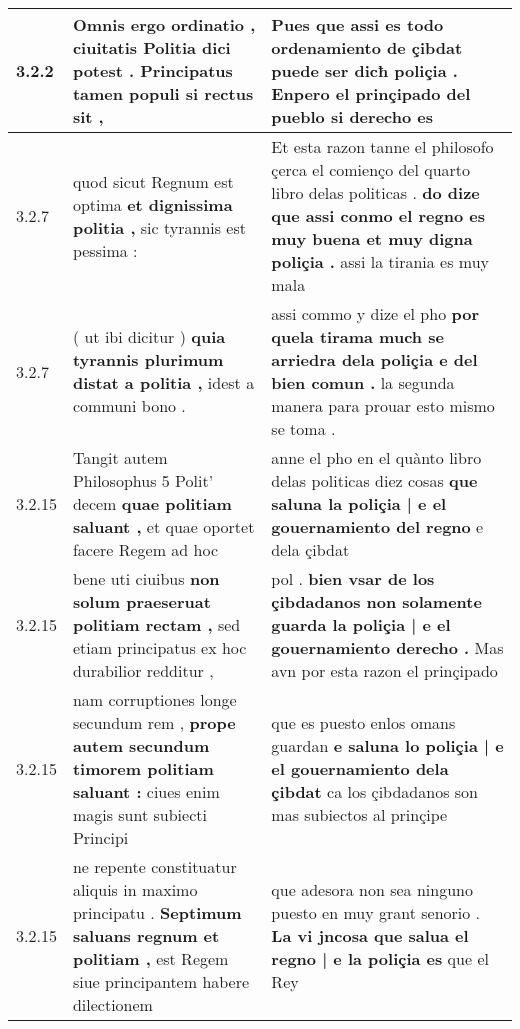 \begin{tabular}{|p{1cm}|p{6.5cm}|p{6.5cm}|}
3.2.2 & Omnis ergo ordinatio , \textbf{ ciuitatis Politia dici potest . } Principatus tamen populi si rectus sit , & Pues que assi es todo ordenamiento de çibdat \textbf{ puede ser dicħ poliçia . } Enpero el prinçipado del pueblo si derecho es \\\hline
3.2.7 & quod sicut Regnum est optima \textbf{ et dignissima politia , } sic tyrannis est pessima : & Et esta razon tanne el philosofo çerca el comienço del quarto libro delas politicas . \textbf{ do dize que assi conmo el regno es muy buena et muy digna poliçia . } assi la tirania es muy mala \\\hline
3.2.7 & ( ut ibi dicitur ) \textbf{ quia tyrannis plurimum distat a politia , } idest a communi bono . & assi commo y dize el pho \textbf{ por quela tirama much se arriedra dela poliçia e del bien comun . } la segunda manera para prouar esto mismo se toma . \\\hline
3.2.15 & Tangit autem Philosophus 5 Polit’ decem \textbf{ quae politiam saluant , } et quae oportet facere Regem ad hoc & anne el pho en el quànto libro delas politicas diez cosas \textbf{ que saluna la poliçia | e el gouernamiento del regno } e dela çibdat \\\hline
3.2.15 & bene uti ciuibus \textbf{ non solum praeseruat politiam rectam , } sed etiam principatus ex hoc durabilior redditur , & pol . \textbf{ bien vsar de los çibdadanos non solamente guarda la poliçia | e el gouernamiento derecho . } Mas avn por esta razon el prinçipado \\\hline
3.2.15 & nam corruptiones longe secundum rem , \textbf{ prope autem secundum timorem politiam saluant : } ciues enim magis sunt subiecti Principi & que es puesto enlos omans guardan \textbf{ e saluna lo poliçia | e el gouernamiento dela çibdat } ca los çibdadanos son mas subiectos al prinçipe \\\hline
3.2.15 & ne repente constituatur aliquis in maximo principatu . \textbf{ Septimum saluans regnum et politiam , } est Regem siue principantem habere dilectionem & que adesora non sea ninguno puesto en muy grant senorio . \textbf{ La vi jncosa que salua el regno | e la poliçia es } que el Rey \\\hline

\end{tabular}
